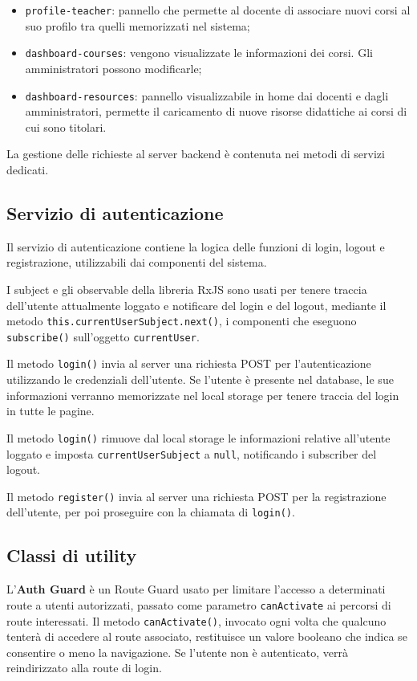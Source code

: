 \begin{itemize}
\begin{itemize}
\end{itemize}
	\item \texttt{profile-teacher}: pannello che permette al docente di associare nuovi corsi al suo profilo tra quelli memorizzati nel sistema;
	\item \texttt{dashboard-courses}: vengono visualizzate le informazioni dei corsi. Gli amministratori possono modificarle;
	\item \texttt{dashboard-resources}: pannello visualizzabile in home dai docenti e dagli amministratori, permette il caricamento di nuove risorse didattiche ai corsi di cui sono titolari.
\end{itemize}

La gestione delle richieste al server backend è contenuta nei metodi di servizi dedicati.

\subsection{Servizio di autenticazione}
Il servizio di autenticazione contiene la logica delle funzioni di login, logout e registrazione, utilizzabili dai componenti del sistema.

I subject e gli observable della libreria RxJS sono usati per tenere traccia dell'utente attualmente loggato e notificare del login e del logout, mediante il metodo \texttt{this.currentUserSubject.next()}, i componenti che eseguono \texttt{subscribe()} sull'oggetto \texttt{currentUser}.

Il metodo \texttt{login()} invia al server una richiesta POST per l'autenticazione utilizzando le credenziali dell'utente. Se l'utente è presente nel database, le sue informazioni verranno memorizzate nel local storage per tenere traccia del login in tutte le pagine.

Il metodo \texttt{login()} rimuove dal local storage le informazioni relative all'utente loggato e imposta \texttt{currentUserSubject} a \texttt{null}, notificando i subscriber del logout.

Il metodo \texttt{register()} invia al server una richiesta POST per la registrazione dell'utente, per poi proseguire con la chiamata di \texttt{login()}.

\subsection{Classi di utility}
L'\textbf{Auth Guard} è un Route Guard usato per limitare l'accesso a determinati route a utenti autorizzati, passato come parametro \texttt{canActivate} ai percorsi di route interessati. Il metodo \texttt{canActivate()}, invocato ogni volta che qualcuno tenterà di accedere al route associato, restituisce un valore booleano che indica se consentire o meno la navigazione. Se l’utente non è autenticato, verrà reindirizzato alla route di login.

